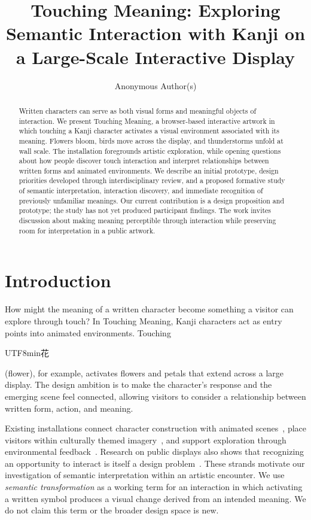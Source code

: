 \documentclass[manuscript,review,anonymous]{acmart}
\title{Touching Meaning: Exploring Semantic Interaction with Kanji on a Large-Scale Interactive Display}
\author{Anonymous Author(s)}
\newcommand{\kanji}[1]{\begin{CJK}{UTF8}{min}#1\end{CJK}}
\begin{document}
\begin{abstract}
Written characters can serve as both visual forms and meaningful objects of interaction. We present Touching Meaning, a browser-based interactive artwork in which touching a Kanji character activates a visual environment associated with its meaning. Flowers bloom, birds move across the display, and thunderstorms unfold at wall scale. The installation foregrounds artistic exploration, while opening questions about how people discover touch interaction and interpret relationships between written forms and animated environments. We describe an initial prototype, design priorities developed through interdisciplinary review, and a proposed formative study of semantic interpretation, interaction discovery, and immediate recognition of previously unfamiliar meanings. Our current contribution is a design proposition and prototype; the study has not yet produced participant findings. The work invites discussion about making meaning perceptible through interaction while preserving room for interpretation in a public artwork.
\end{abstract}
\maketitle

\section{Introduction}
How might the meaning of a written character become something a visitor can explore through touch? In Touching Meaning, Kanji characters act as entry points into animated environments. Touching \kanji{花} (flower), for example, activates flowers and petals that extend across a large display. The design ambition is to make the character's response and the emerging scene feel connected, allowing visitors to consider a relationship between written form, action, and meaning.

Existing installations connect character construction with animated scenes~\cite{cheng2020}, place visitors within culturally themed imagery~\cite{li2024}, and support exploration through environmental feedback~\cite{vanrenswouw2022}. Research on public displays also shows that recognizing an opportunity to interact is itself a design problem~\cite{mueller2012}. These strands motivate our investigation of semantic interpretation within an artistic encounter. We use \emph{semantic transformation} as a working term for an interaction in which activating a written symbol produces a visual change derived from an intended meaning. We do not claim this term or the broader design space is new.
\end{document}
